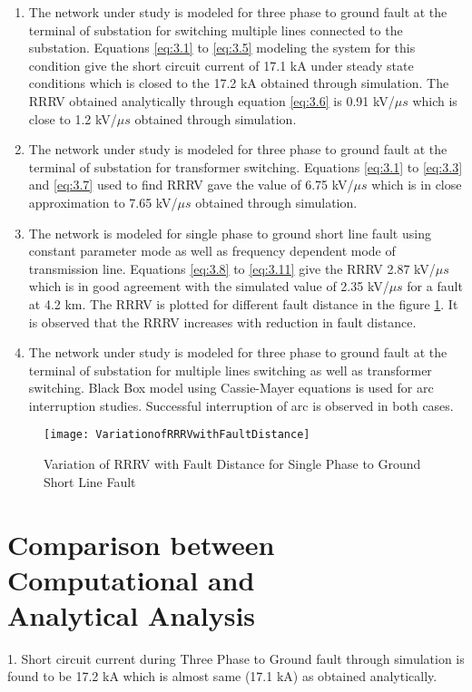 \begin{enumerate}
\item The network under study is modeled for three phase to ground fault at the terminal of substation for switching multiple lines connected to the substation. Equations \ref{eq:3.1} to  \ref{eq:3.5} modeling the system for this condition give the short circuit current of 17.1 kA under steady state conditions which is closed to the 17.2 kA obtained through simulation. The RRRV obtained analytically through equation  \ref{eq:3.6} is 0.91 kV/$\mu s$ which is close to 1.2 kV/$\mu s$ obtained through simulation. 

\item The network under study is modeled for three phase to ground fault at the terminal of substation for transformer switching. Equations \ref{eq:3.1} to \ref{eq:3.3} and \ref{eq:3.7} used to find RRRV gave the value of 6.75 kV/$\mu s$ which is in close approximation to 7.65 kV/$\mu s$ obtained through simulation.

\item The network is modeled for single phase to ground short line fault using constant parameter mode as well as frequency dependent mode of transmission line. Equations \ref{eq:3.8} to \ref{eq:3.11} give the RRRV 2.87 kV/$\mu s$ which is in good agreement with the simulated value of 2.35 kV/$\mu s$ for a fault at 4.2 km. The RRRV is plotted for different fault distance in the figure \ref{fig:Variation of RRRV with Fault Distance for Single Phase to Ground Short Line Fault}. It is observed that the RRRV increases with reduction in fault distance.

\item The network under study is modeled for three phase to ground fault at the terminal of substation for multiple lines switching as well as transformer switching. Black Box model using Cassie-Mayer equations is used for arc interruption studies. Successful interruption of arc is observed in both cases.
\end{enumerate}

\begin{figure}[!htbp]
    \centering
    \texttt{[image: VariationofRRRVwithFaultDistance]}
    \caption{Variation of RRRV with Fault Distance for Single Phase to Ground Short Line Fault}
    \label{fig:Variation of RRRV with Fault Distance for Single Phase to Ground Short Line Fault}
\end{figure}

\section[Comparison between Computational and Analytical Analysis]{Comparison between Computational and\\Analytical Analysis}
1. Short circuit current during Three Phase to Ground fault through simulation is found to be 17.2 kA which is almost same (17.1 kA) as obtained analytically.

